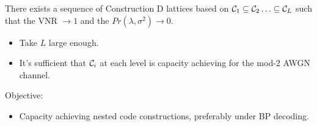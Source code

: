 \documentclass[10pt,presentation]{beamer}
\begin{document}
\begin{frame}
        \begin{theorem}
There exists a sequence of Construction D lattices based on $\mathcal{C}_{1}\subseteq \mathcal{C}_{2}\ldots \subseteq \mathcal{C}_{L}$ such that the VNR $\rightarrow 1$ and the $Pr(\lambda,\sigma^{2})\rightarrow 0$.
       \end{theorem}

\begin{itemize}
\item Take $L$ large enough.
\item It's sufficient that $\mathcal{C}_{i}$ at each level is capacity achieving for the mod-2 AWGN channel.
\end{itemize}
\pause
\vspace{0.4in}
Objective:
\begin{itemize}
\item Capacity achieving nested code constructions, preferably under BP decoding.
\end{itemize}
\end{frame}
\end{document}
